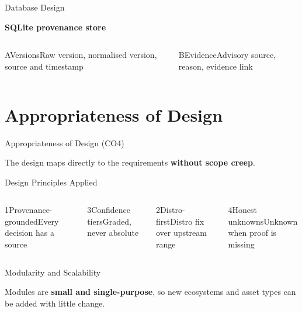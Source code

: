 \documentclass[aspectratio=169,12pt]{beamer}
\newlength{\ch}\setlength{\ch}{47mm}
\begin{document}
\begin{frame}{Database Design}
\begin{stmt}[height={14mm},height plus=30mm,fontupper=\Large]\textbf{SQLite provenance store}\end{stmt}\vskip2.5mm\setlength{\ch}{31mm}
\begin{columns}[T,onlytextwidth]
\begin{tc}{A}{Versions}\normalsize Raw version, normalised version, source and timestamp\end{tc}
\begin{tcteal}{B}{Evidence}\normalsize Advisory source, reason, evidence link\end{tcteal}
\end{columns}
\end{frame}

\section{Appropriateness of Design}
\begin{frame}{Appropriateness of Design (CO4)}
\begin{stmt}The design maps directly to the requirements \textbf{without scope creep}.\end{stmt}
\end{frame}

\begin{frame}{Design Principles Applied}
\setlength{\ch}{25mm}
\begin{columns}[T,onlytextwidth]
\begin{tc}{1}{Provenance-grounded}\normalsize Every decision has a source\end{tc}\vskip2.5mm\begin{tc}{3}{Confidence tiers}\normalsize Graded, never absolute\end{tc}
\begin{tcteal}{2}{Distro-first}\normalsize Distro fix over upstream range\end{tcteal}\vskip2.5mm\begin{tcteal}{4}{Honest unknowns}\normalsize Unknown when proof is missing\end{tcteal}
\end{columns}
\end{frame}

\begin{frame}{Modularity and Scalability}
\begin{stmt}Modules are \textbf{small and single-purpose}, so new ecosystems and asset types can be added with little change.\end{stmt}
\end{frame}
\end{document}

